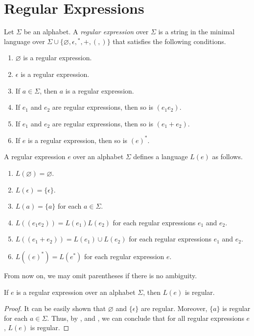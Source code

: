 \section{Regular Expressions}
\begin{definition}
  Let $\Sigma$ be an alphabet.
  A \emph{regular expression} over $\Sigma$ is a string in the minimal language
  over $\Sigma \cup \{\varnothing, \epsilon, {}^*, +, (, )\}$
  that satisfies the following conditions.
  \begin{enumerate}[1.]
    \item $\varnothing$ is a regular expression.
    \item $\epsilon$ is a regular expression.
    \item If $a \in \Sigma$, then $a$ is a regular expression.
    \item If $e_1$ and $e_2$ are regular expressions, then so is $(e_1e_2)$.
    \item If $e_1$ and $e_2$ are regular expressions, then so is
    $(e_1 + e_2)$.
    \item If $e$ is a regular expression, then so is $(e)^*$.
  \end{enumerate}
\end{definition}

\begin{definition}
  A regular expression $e$ over an alphabet $\Sigma$ defines a language $L(e)$
  as follows.
  \begin{enumerate}[1.]
    \item $L(\varnothing) = \varnothing$.
    \item $L(\epsilon) = \{\epsilon\}$.
    \item $L(a) = \{a\}$ for each $a \in \Sigma$.
    \item $L((e_1e_2)) = L(e_1)L(e_2)$ for each regular expressions $e_1$ and
    $e_2$.
    \item $L((e_1 + e_2)) = L(e_1) \cup L(e_2)$ for each regular
    expressions $e_1$ and $e_2$.
    \item $L((e)^*) = L(e^*)$ for each regular expression $e$.
  \end{enumerate}
\end{definition}

\begin{remark}
  From now on, we may omit parentheses if there is no ambiguity.
\end{remark}

\begin{lemma}
  \label{thm:regex-to-regular}
  If $e$ is a regular expression over an alphabet $\Sigma$, then $L(e)$ is
  regular.
\end{lemma}
\begin{proof}
  It can be easily shown that $\varnothing$ and $\{\epsilon\}$ are regular.
  Moreover, $\{a\}$ is regular for each $a \in \Sigma$.
  Thus, by ,  and
  , we can conclude that for all regular expressions
  $e$, $L(e)$ is regular.
\end{proof}

